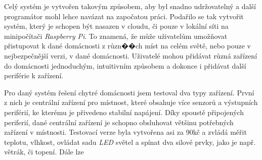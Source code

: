 Celý systém je vytvořen takovým způsobem, aby byl snadno udržovatelný a další programátor mohl lehce navázat na započatou práci.
Podařilo se tak vytvořit systém, který je schopen být nasazen v cloudu, či pouze v lokální síti na minipočítači \emph{Raspberry Pi}.
To znamená, že může uživatelům umožňovat přistupovat k dané domácnosti z různ��ch míst na celém světě, nebo pouze v nejbezpečnější verzi, v dané domácnosti.
Uživatelé mohou přidávat různá zařízení do domácnosti jednoduchým, intuitivním způsobem a dokonce i přidávat další periférie k zařízení.

Pro daný systém řešení chytré domácnosti jsem testoval dva typy zařízení.
První z nich je centrální zařízení pro místnost, které obsahuje více senzorů a výstupních periférií, ke kterému je přivedeno stabilní napájení.
Díky spoustě připojených periferií, dané centrální zařízení je schopno obsluhovat většinu potřebných zařízení v místnosti.
Testovací verze byla vytvořena asi za 90kč a zvládá měřit teplotu, vlhkost, ovládat sadu \emph{LED} světel a spínat dva silové prvky, jako je např. větrák, či topení.
Dále lze

